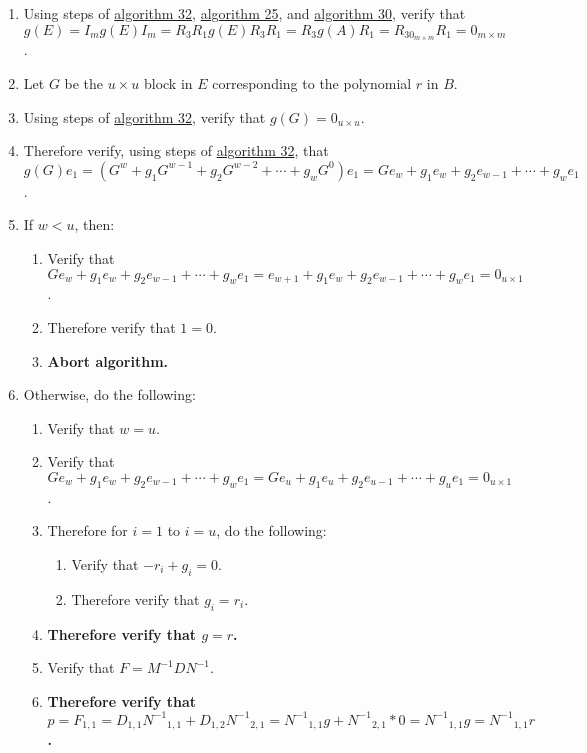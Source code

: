 \documentclass[twocolumn]{article}
\begin{document}
\begin{enumerate}
				\item Using steps of \hyperref[sec:algorithm 32]{algorithm 32}, \hyperref[sec:algorithm 25]{algorithm 25}, and \hyperref[sec:algorithm 30]{algorithm 30}, verify that $g(E)=I_mg(E)I_m=R_3R_1g(E)R_3R_1=R_3g(A)R_1=R_30_{m\times m}R_1=0_{m\times m}$.
				\item Let $G$ be the $u\times u$ block in $E$ corresponding to the polynomial $r$ in $B$.
				\item Using steps of \hyperref[sec:algorithm 32]{algorithm 32}, verify that $g(G)=0_{u\times u}$.
				\item Therefore verify, using steps of \hyperref[sec:algorithm 32]{algorithm 32}, that $g(G)e_1=(G^w+g_1G^{w-1}+g_2G^{w-2}+\cdots+g_wG^0)e_1=Ge_w+g_1e_w+g_2e_{w-1}+\cdots+g_we_1$.
				\item If $w<u$, then:
				\begin{enumerate}
					\item Verify that $Ge_w+g_1e_w+g_2e_{w-1}+\cdots+g_we_1=e_{w+1}+g_1e_w+g_2e_{w-1}+\cdots+g_we_1=0_{u\times 1}$.
					\item Therefore verify that $1=0$.
					\item \textbf{Abort algorithm.}
				\end{enumerate}
				\item Otherwise, do the following:
				\begin{enumerate}
					\item Verify that $w=u$.
					\item Verify that $Ge_w+g_1e_w+g_2e_{w-1}+\cdots+g_we_1=Ge_u+g_1e_u+g_2e_{u-1}+\cdots+g_ue_1=0_{u\times 1}$.
					\item Therefore for $i=1$ to $i=u$, do the following:
					\begin{enumerate}
						\item Verify that $-r_i+g_i=0$.
						\item Therefore verify that $g_i=r_i$.
					\end{enumerate}
					\item \textbf{Therefore verify that $g=r$.}
					\item Verify that $F=M^{-1}DN^{-1}$.
					\item \textbf{Therefore verify that $p=F_{1,1}=D_{1,1}{N^{-1}}_{1,1}+D_{1,2}{N^{-1}}_{2,1}={N^{-1}}_{1,1}g+{N^{-1}}_{2,1}*0={N^{-1}}_{1,1}g={N^{-1}}_{1,1}r$.}
				\end{enumerate}
			\end{enumerate}
\end{document}

